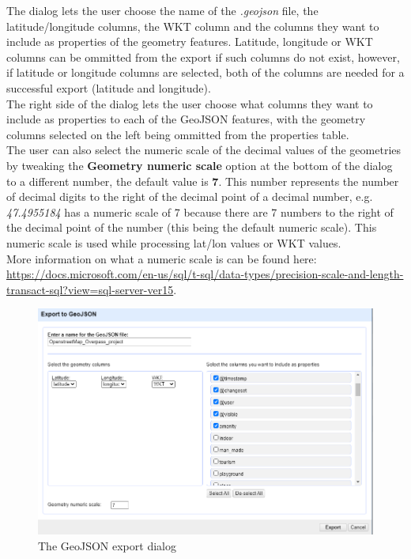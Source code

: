 The dialog lets the user choose the name of the \textit{.geojson} file, the latitude/longitude columns, the WKT column
and the columns they want to include as properties of the geometry features. Latitude, longitude or WKT columns can be
ommitted from the export if such columns do not exist, however, if latitude or longitude columns are selected,
both of the columns are needed for a successful export (latitude and longitude).\\
\newline
The right side of the dialog lets the user choose what columns they want to include as properties to each of the GeoJSON features,
with the geometry columns selected on the left being ommitted from the properties table.\\
\newline
The user can also select the numeric scale of the decimal values of the geometries by tweaking the \textbf{Geometry numeric scale}
option at the bottom of the dialog to a different number, the default value is \textbf{7}. This number represents the
number of decimal digits to the right  of the decimal point of a decimal number, e.g. \textit{47.4955184} has a numeric scale of
7 because there are 7 numbers to the right of the decimal point of the number (this being the default numeric scale).
This numeric scale is used while processing lat/lon values or WKT values. \\
\newline
More information on what a numeric scale is can be found here:
\href{https://docs.microsoft.com/en-us/sql/t-sql/data-types/precision-scale-and-length-transact-sql?view=sql-server-ver15}{https://docs.microsoft.com/en-us/sql/t-sql/data-types/precision-scale-and-length-transact-sql?view=sql-server-ver15}.

\begin{figure}[H]
    \includegraphics[width=\linewidth]{./Figures/GeoJSON_Export/geojson_export_dialog.png}
    \caption{The GeoJSON export dialog}
\end{figure}

